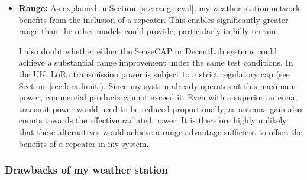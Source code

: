 \begin{itemize}
  \item \textbf{Range:} As explained in Section~\ref{sec:range-eval}, my weather
        station network benefits from the inclusion of a repeater. This enables
        significantly greater range than the other models could provide,
        particularly in hilly terrain.

        I also doubt whether either the SenseCAP or DecentLab systems could
        achieve a substantial range improvement under the same test conditions.
        In the UK, LoRa transmission power is subject to a strict regulatory cap
        (see Section~\ref{sec:lora-limit}). Since my system already operates at
        this maximum power, commercial products cannot exceed it. Even with a
        superior antenna, transmit power would need to be reduced
        proportionally, as antenna gain also counts towards the effective
        radiated power. It is therefore highly unlikely that these alternatives
        would achieve a range advantage sufficient to offset the benefits of a
        repeater in my system.
\end{itemize}

\subsubsection{Drawbacks of my weather station}

